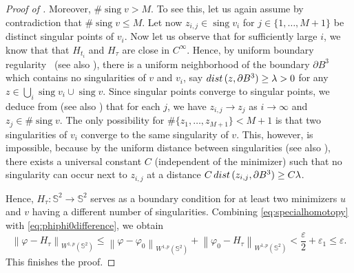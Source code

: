 \documentclass[12pt]{amsart}
\newcommand{\sing}{\operatorname{sing}}
\def\eps{\varepsilon}
\def\S{{\mathbb S}}
\def\dist{{\rm dist\,}}
\newcommand{\norm}[1]{\left\|{#1}\right\|}
\numberwithin{theorem}{section} \numberwithin{equation}{section}
\begin{document}
\begin{proof}[Proof of ]
Moreover, $\#\sing v > M$. 
To see this, let us again assume by contradiction that $\#\sing v \le  M$. 
Let now $z_{i,j}\in \sing v_i$ for $j\in\{1,\ldots,M+1\}$ be distinct singular points of $v_i$. 
Now let us observe that for sufficiently large $i$, we know that that $H_{t_i}$ and $H_\tau$ are close in $C^\infty$. 
Hence, by uniform boundary regularity~\cite[Theorem 1.10 (2)]{AL88} (see also \cite[Theorem 7.4]{MMS}), there is a uniform neighborhood of the boundary $\partial B^3$ which contains no singularities of $v$ and $v_i$, say $\dist(z,\partial B^3) \ge \lambda > 0$ for any $z\in \bigcup_i\sing v_i \cup \sing v$. 
Since singular points converge to singular points, we deduce from \cite[Theorem 1.8 (1)]{AL88} (see also \cite[Theorem 2.5]{MMS}) that for each $j$, we have $z_{i,j}\to z_j$ as $i\to \infty$ and $z_j\in\#\sing v$. 
The only possibility for $\# \{z_1,\ldots, z_{M+1}\}< M+1$ is that two singularities of $v_i$ converge to the same singularity of $v$. 
This, however, is impossible, because by the uniform distance between singularities \cite[Theorem 2.1]{AL88} (see also \cite[Theorem 2.12]{MMS}), there exists a universal constant $C$ (independent of the minimizer) such that no singularity can occur next to $z_{i,j}$ at a distance $C \,\dist(z_{i,j},\partial B^3) \ge C\lambda$.

Hence, $H_\tau \colon \S^2\to\S^2$ serves as a boundary condition for at least two minimizers $u$ and $v$ having a different number of singularities. Combining \eqref{eq:specialhomotopy} with \eqref{eq:phiphi0difference}, we obtain
\[
 \norm{\varphi - H_\tau}_{W^{1,p}(\S^2)} \le \norm{\varphi - \varphi_0}_{W^{1,p}(\S^2)} + \norm{\varphi_0 - H_\tau}_{W^{1,p}(\S^2)} < \frac{\eps}{2} + \eps_1 \leq \eps.
\]
This finishes the proof.
\end{proof}

%
\end{document}

